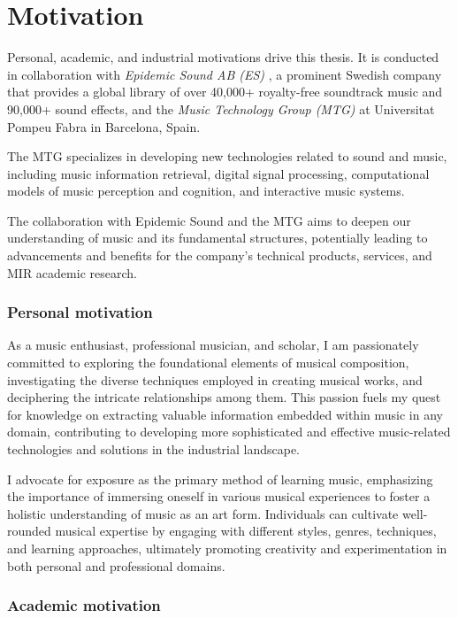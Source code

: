 \section{Motivation}

Personal, academic, and industrial motivations drive this thesis. It is conducted in collaboration with \textit{Epidemic Sound AB (ES)} \cite{EpidemicSite}, a prominent Swedish company that provides a global library of over 40,000+ royalty-free soundtrack music and 90,000+ sound effects, and the \textit{Music Technology Group (MTG)} at Universitat Pompeu Fabra in Barcelona, Spain. 

The MTG specializes in developing new technologies related to sound and music, including music information retrieval, digital signal processing, computational models of music perception and cognition, and interactive music systems. 

The collaboration with Epidemic Sound and the MTG aims to deepen our understanding of music and its fundamental structures, potentially leading to advancements and benefits for the company's technical products, services, and MIR academic research.

\subsubsection{Personal motivation}

As a music enthusiast, professional musician, and scholar, I am passionately committed to exploring the foundational elements of musical composition, investigating the diverse techniques employed in creating musical works, and deciphering the intricate relationships among them. This passion fuels my quest for knowledge on extracting valuable information embedded within music in any domain, contributing to developing more sophisticated and effective music-related technologies and solutions in the industrial landscape.

I advocate for exposure as the primary method of learning music, emphasizing the importance of immersing oneself in various musical experiences to foster a holistic understanding of music as an art form. Individuals can cultivate well-rounded musical expertise by engaging with different styles, genres, techniques, and learning approaches, ultimately promoting creativity and experimentation in both personal and professional domains.

\subsubsection{Academic motivation}


